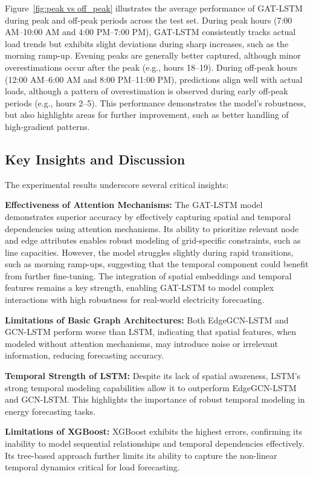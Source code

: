 \documentclass[sigconf,nonacm]{acmart}
\begin{document}
Figure~\ref{fig:peak vs off_peak} illustrates the average performance of GAT-LSTM during peak and off-peak periods across the test set. During peak hours (7:00 AM–10:00 AM and 4:00 PM–7:00 PM), GAT-LSTM consistently tracks actual load trends but exhibits slight deviations during sharp increases, such as the morning ramp-up. Evening peaks are generally better captured, although minor overestimations occur after the peak (e.g., hours 18–19). During off-peak hours (12:00 AM–6:00 AM and 8:00 PM–11:00 PM), predictions align well with actual loads, although a pattern of overestimation is observed during early off-peak periods (e.g., hours 2–5). This performance demonstrates the model's robustness, but also highlights areas for further improvement, such as better handling of high-gradient patterns.

\subsection{Key Insights and Discussion}

The experimental results underscore several critical insights:

\textbf{Effectiveness of Attention Mechanisms:} The GAT-LSTM model demonstrates superior accuracy by effectively capturing spatial and temporal dependencies using attention mechanisms. Its ability to prioritize relevant node and edge attributes enables robust modeling of grid-specific constraints, such as line capacities. However, the model struggles slightly during rapid transitions, such as morning ramp-ups, suggesting that the temporal component could benefit from further fine-tuning. The integration of spatial embeddings and temporal features remains a key strength, enabling GAT-LSTM to model complex interactions with high robustness for real-world electricity forecasting.

\textbf{Limitations of Basic Graph Architectures:} Both EdgeGCN-LSTM and GCN-LSTM perform worse than LSTM, indicating that spatial features, when modeled without attention mechanisms, may introduce noise or irrelevant information, reducing forecasting accuracy.

\textbf{Temporal Strength of LSTM:} Despite its lack of spatial awareness, LSTM's strong temporal modeling capabilities allow it to outperform EdgeGCN-LSTM and GCN-LSTM. This highlights the importance of robust temporal modeling in energy forecasting tasks.

\textbf{Limitations of XGBoost: }XGBoost exhibits the highest errors, confirming its inability to model sequential relationships and temporal dependencies effectively. Its tree-based approach further limits its ability to capture the non-linear temporal dynamics critical for load forecasting.
\end{document}

